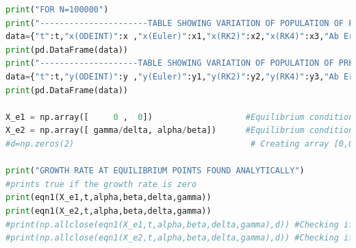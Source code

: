 \documentclass[12pt]{article}
\begin{document}
\begin{lstlisting}[language=Python, caption=Python example]
print("FOR N=100000")
print("----------------------TABLE SHOWING VARIATION OF POPULATION OF PREY(x) WITH TIME(t)-------------------------")
data={"t":t,"x(ODEINT)":x ,"x(Euler)":x1,"x(RK2)":x2,"x(RK4)":x3,"Ab Error (Euler)":xee,"Ab Error (RK2)":xer2,"Ab Error (RK4)":xer4}
print(pd.DataFrame(data))
print("--------------------TABLE SHOWING VARIATION OF POPULATION OF PREDATOR(y) WITH TIME(t)-----------------------")
data={"t":t,"y(ODEINT)":y ,"y(Euler)":y1,"y(RK2)":y2,"y(RK4)":y3,"Ab Error (Euler)":yee,"Ab Error (RK2)":yer2,"Ab Error (RK4)":yer4}
print(pd.DataFrame(data))

X_e1 = np.array([     0 ,  0])                   #Equilibrium condition 1
X_e2 = np.array([ gamma/delta, alpha/beta])      #Equilibrium condition 2 
#d=np.zeros(2)                                    # Creating array [0,0]

print("GROWTH RATE AT EQUILIBRIUM POINTS FOUND ANALYTICALLY")
#prints true if the growth rate is zero
print(eqn1(X_e1,t,alpha,beta,delta,gamma))
print(eqn1(X_e2,t,alpha,beta,delta,gamma))
#print(np.allclose(eqn1(X_e1,t,alpha,beta,delta,gamma),d)) #Checking if the growth rate of predator and prey is zero at equilibrium condition 1
#print(np.allclose(eqn1(X_e2,t,alpha,beta,delta,gamma),d)) #Checking if the growth rate of predator and prey is zero at equilibrium condition 2


\end{lstlisting}
\newpage
\end{document}
